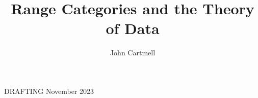 \documentclass[10pt,a4paper]{article}
\theoremstyle{remark}
\begin{document}
\title{Range Categories and the Theory of Data}


\author{John Cartmell}

\date{}

\maketitle

\begin{center}
DRAFTING November 2023
\end{center}

\newcommand{\binarysourcediag}[5]{
$
\begin{array}{c p{0.5cm} c  }
             &&   \Rnode{b}{#2} \\[0.01cm]
\Rnode{a}{#1} &&                \\[0.01cm] 
             &&   \Rnode{c}{#3} 
\end{array} 
\begin{arrows}
\ncarr{a}{b}
\alabel{#4}
\ncarr{a}{c}
\blabel{#5}
\end{arrows}
$  
}
\newcommand{\fgsourcediag}{\binarysourcediag{a}{b}{c}{f}{g}}

\newcommand{\paralleldiag}[4]
{
 $
\rule[-0.3cm]{0pt}{0.9cm} %
\begin{array}{c p{0.5cm} c  }
 \Rnode{a}{#1}     &&   \Rnode{b}{#2}
\end{array} 
\begin{arrows}
\ncarc[nodesep=2pt,arcangle=10,offset=2pt]{->}{a}{b}
\alabel{#3}
\ncarc[nodesep=2pt,arcangle=-10,offset=-2pt]{->}{a}{b}
\blabel{#4}
\end{arrows}
$  
}

\newcommand{\sequentialdiag}[5]
{$
\begin{array}{c p{0.5cm} c p{0.5cm} c }
 \Rnode{a}{#1}     &&   \Rnode{b}{#2} && \Rnode{c}{#3}
\end{array} 
\begin{arrows}
\ncarr{a}{b}
\alabel{#4}
\ncarr{b}{c}
\alabel{#5}
\end{arrows}
$}

\iffalse
\newcommand{\fnsourceqnsource}
{
$
\begin{array}{c p{0.25cm} c  p{0.25cm} c }
             &&   \Rnode{b1}{b_1} &&              \\[0.4cm]
\Rnode{a}{a} &&                   && \Rnode{c}{c} \\[0.4cm]
             &&   \Rnode{bn}{b_n} &&              
\end{array} 
\begin{arrows}
\ncarr{a}{b1}
\alabel{f_1}
\ncarr{c}{b1}
\blabel{q_1} 
\ncarr{a}{bn}
\blabel{f_n}
\ncarr{c}{bn}
\alabel{q_n}
\end{arrows}
$   
}
\fi
\end{document}
